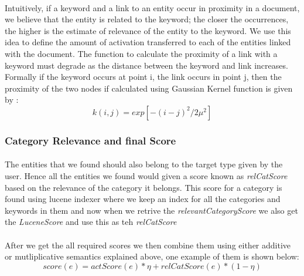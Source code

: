 \documentclass[a4paper,12pt]{report}
\begin{document}
\paragraph*{}
Intuitively, if a keyword and a link to an entity occur in proximity in a document, we believe that the entity is related to the keyword; the closer the occurrences, the higher is the estimate of relevance of the entity to the keyword. We use this idea to define the amount of activation transferred to each of the entities linked with the document. The function to calculate the proximity of a link with a keyword must degrade as the distance between the keyword and link increases. Formally if the keyword occurs at point i, the link occurs in point j, then the proximity of the two nodes if calculated using Gaussian Kernel function is given by :
\begin{equation}k(i, j) = exp[-(i - j) ^ 2 / 2\mu^2]\end{equation} 
\subsubsection{Category Relevance and final Score}
\paragraph*{}
The entities that we found should also belong to the target type given by the user. Hence all the entities we found would given a score known as \textit{relCatScore} based on the relevance of the category it belongs. This score for a category is found using lucene indexer where we keep an index for all the categories and keywords in them and now when we retrive the \textit{relevantCategoryScore} we also get the \textit{LuceneScore}
and use this as teh \textit{relCatScore}
\paragraph*{}
After we get the all required scores we then combine them using either additive or mutliplicative semantics explained above, one example of them is shown below:
\begin{equation}score(e) = actScore(e) * \eta + relCatScore(e) * (1 - \eta) \end{equation} 
\end{document}

